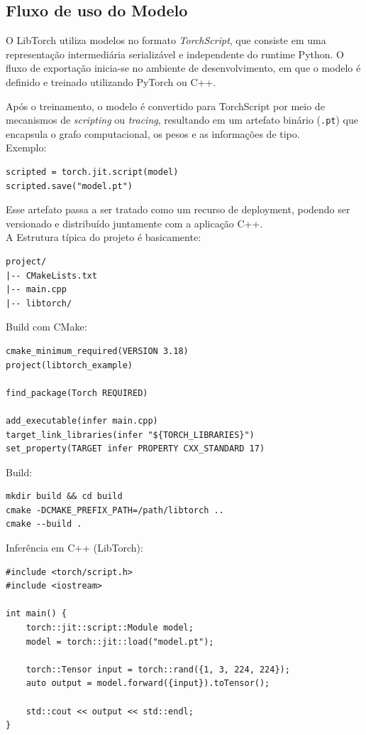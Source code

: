\subsection{Fluxo de uso do Modelo}

O LibTorch utiliza modelos no formato \textit{TorchScript}, que consiste em uma
representação intermediária serializável e independente do runtime Python.
O fluxo de exportação inicia-se no ambiente de desenvolvimento, em que o modelo é
definido e treinado utilizando PyTorch ou C++.

Após o treinamento, o modelo é convertido para TorchScript por meio de mecanismos
de \textit{scripting} ou \textit{tracing}, resultando em um artefato binário
(\texttt{.pt}) que encapsula o grafo computacional, os pesos e as informações de tipo.\\

Exemplo:
\begin{verbatim}
scripted = torch.jit.script(model)
scripted.save("model.pt")
\end{verbatim}


Esse artefato passa a ser tratado como um recurso de deployment, podendo ser versionado
e distribuído juntamente com a aplicação C++. \\
A Estrutura típica do projeto é basicamente:

\begin{verbatim}
project/
|-- CMakeLists.txt
|-- main.cpp
|-- libtorch/
\end{verbatim}

Build com CMake:
\begin{verbatim}
cmake_minimum_required(VERSION 3.18)
project(libtorch_example)

find_package(Torch REQUIRED)

add_executable(infer main.cpp)
target_link_libraries(infer "${TORCH_LIBRARIES}")
set_property(TARGET infer PROPERTY CXX_STANDARD 17)
\end{verbatim}

Build:
\begin{verbatim}
mkdir build && cd build
cmake -DCMAKE_PREFIX_PATH=/path/libtorch ..
cmake --build .
\end{verbatim}

Inferência em C++ (LibTorch):
\begin{verbatim}
#include <torch/script.h>
#include <iostream>

int main() {
    torch::jit::script::Module model;
    model = torch::jit::load("model.pt");

    torch::Tensor input = torch::rand({1, 3, 224, 224});
    auto output = model.forward({input}).toTensor();

    std::cout << output << std::endl;
}
\end{verbatim}

